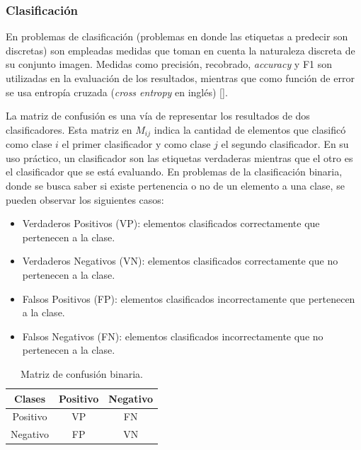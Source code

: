 \subsubsection{Clasificación}

En problemas de clasificación (problemas en donde las etiquetas a predecir son discretas) 
son empleadas medidas que toman en cuenta la naturaleza discreta de su conjunto imagen.
Medidas como precisión, recobrado, \emph{accuracy} y F1 son utilizadas en la 
evaluación de los resultados, mientras que como función de error se usa entropía cruzada 
(\emph{cross entropy} en inglés) [\cite{grandini2020metrics}].

La matriz de confusión es una vía de representar los resultados de dos clasificadores. Esta matriz en $M_{ij}$ 
indica la cantidad de elementos que clasificó como clase $i$ el primer clasificador y
como clase $j$ el segundo clasificador. En su uso práctico,
un clasificador son las etiquetas verdaderas mientras que el otro es el clasificador que se está evaluando. 
En problemas de la clasificación binaria, donde se busca saber si existe pertenencia o no de un elemento a una clase,
se pueden observar los siguientes casos:

\begin{itemize}
	\item Verdaderos Positivos (VP): elementos clasificados correctamente que pertenecen a la clase.
	\item Verdaderos Negativos (VN): elementos clasificados correctamente que no pertenecen a la clase.
	\item Falsos Positivos (FP): elementos clasificados incorrectamente que pertenecen a la clase.
	\item Falsos Negativos (FN): elementos clasificados incorrectamente que no pertenecen a la clase.
\end{itemize}

\begin{table}[h!]
	\begin{center}
		\begin{tabular}{|c|c|c|} \hline
		Clases		& Positivo	& Negativo  \\ \hline
		Positivo	& VP  		& FN		\\ \hline
		Negativo	& FP		& VN		\\ \hline
		\end{tabular}
	\caption{Matriz de confusión binaria.}\label{fig:confusion_matrix}
	\end{center}
\end{table}


